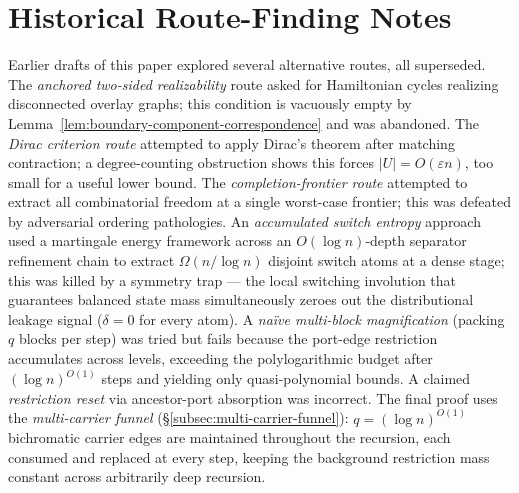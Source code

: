 \documentclass[11pt]{article}
\begin{document}
\appendix

\section{Historical Route-Finding Notes}
\label{app:historical}

Earlier drafts of this paper explored several alternative routes, all
superseded.  The \emph{anchored two-sided realizability} route asked for
Hamiltonian cycles realizing disconnected overlay graphs; this condition is
vacuously empty by Lemma~\ref{lem:boundary-component-correspondence} and was
abandoned.  The \emph{Dirac criterion route} attempted to apply Dirac's
theorem after matching contraction; a degree-counting obstruction shows this
forces $|U| = O(\varepsilon n)$, too small for a useful lower bound.  The
\emph{completion-frontier route} attempted to extract all combinatorial
freedom at a single worst-case frontier; this was defeated by adversarial
ordering pathologies.  An \emph{accumulated switch entropy} approach used a
martingale energy framework across an $O(\log n)$-depth separator refinement
chain to extract $\Omega(n/\log n)$ disjoint switch atoms at a dense stage;
this was killed by a symmetry trap --- the local switching involution that
guarantees balanced state mass simultaneously zeroes out the distributional
leakage signal ($\delta = 0$ for every atom).  A \emph{na\"ive multi-block
magnification} (packing $q$ blocks per step) was tried but fails because the
port-edge restriction accumulates across levels, exceeding the polylogarithmic
budget after $(\log n)^{O(1)}$ steps and yielding only quasi-polynomial
bounds.  A claimed \emph{restriction reset} via ancestor-port absorption was
incorrect.  The final proof uses the \emph{multi-carrier funnel}
(\S\ref{subsec:multi-carrier-funnel}): $q = (\log n)^{O(1)}$ bichromatic
carrier edges are maintained throughout the recursion, each consumed and
replaced at every step, keeping the background restriction mass constant
across arbitrarily deep recursion.
\end{document}
